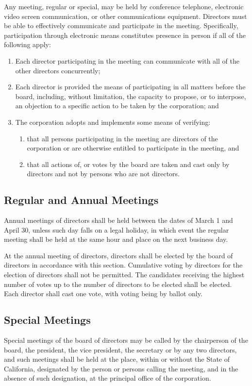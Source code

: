 \documentclass{article}
\begin{document}
	Any meeting, regular or special, may be held by conference telephone, electronic video screen communication, or other communications equipment. Directors must be able to effectively communicate and participate in the meeting. Specifically, participation through electronic means constitutes presence in person if all of the following apply:
	\begin{enumerate}[\indent (a)]
		\item Each director participating in the meeting can communicate with all of the other directors concurrently;
		\item	Each director is provided the means of participating in all matters before the board, including, without limitation, the capacity to propose, or to interpose, an objection to a specific action to be taken by the corporation; and
		\item	The corporation adopts and implements some means of verifying:
		\begin{enumerate}[\indent 1)]
			\item that all persons participating in the meeting are directors of the corporation or are otherwise entitled to participate in the meeting, and
			\item that all actions of, or votes by the board are taken and cast only by directors and not by persons who are not directors. 
		\end{enumerate}	
	\end{enumerate}
	
	
	\subsection{Regular and Annual Meetings}
	Annual meetings of directors shall be held between the dates of March 1 and April 30, unless such day falls on a legal holiday, in which event the regular meeting shall be held at the same hour and place on the next business day. 
	
	At the annual meeting of directors, directors shall be elected by the board of directors in accordance with this section. Cumulative voting by directors for the election of directors shall not be permitted. The candidates receiving the highest number of votes up to the number of directors to be elected shall be elected. Each director shall cast one vote, with voting being by ballot only. 
	
	\subsection{Special Meetings}
	Special meetings of the board of directors may be called by the chairperson of the board, the president, the vice president, the secretary or by any two directors, and such meetings shall be held at the place, within or without the State of California, designated by the person or persons calling the meeting, and in the absence of such designation, at the principal office of the corporation.
	
\end{document}
